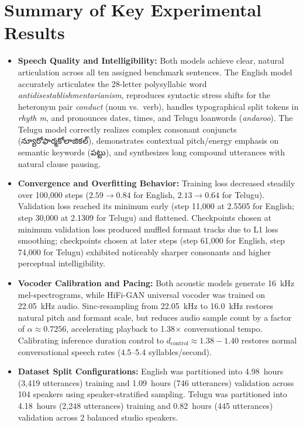 \documentclass[11pt,a4paper]{report}
\newcommand{\texttelugu}[1]{{\telugufont #1}}
\begin{document}
\section{Summary of Key Experimental Results}
\begin{itemize}
    \item \textbf{Speech Quality and Intelligibility:} Both models achieve clear, natural articulation across all ten assigned benchmark sentences. The English model accurately articulates the 28-letter polysyllabic word \textit{antidisestablishmentarianism}, reproduces syntactic stress shifts for the heteronym pair \textit{conduct} (noun vs.\ verb), handles typographical split tokens in \textit{rhyth  m}, and pronounces dates, times, and Telugu loanwords (\textit{andaroo}). The Telugu model correctly realizes complex consonant conjuncts (\texttelugu{న్యూరోఫార్మకోలాజికల్}), demonstrates contextual pitch/energy emphasis on semantic keywords (\texttelugu{పట్టు}), and synthesizes long compound utterances with natural clause pausing.
    \item \textbf{Convergence and Overfitting Behavior:} Training loss decreased steadily over 100{,}000 steps ($2.59 \to 0.84$ for English, $2.13 \to 0.64$ for Telugu). Validation loss reached its minimum early (step 11{,}000 at 2.5505 for English; step 30{,}000 at 2.1309 for Telugu) and flattened. Checkpoints chosen at minimum validation loss produced muffled formant tracks due to L1 loss smoothing; checkpoints chosen at later steps (step 61{,}000 for English, step 74{,}000 for Telugu) exhibited noticeably sharper consonants and higher perceptual intelligibility.
    \item \textbf{Vocoder Calibration and Pacing:} Both acoustic models generate 16~kHz mel-spectrograms, while HiFi-GAN universal vocoder was trained on 22.05~kHz audio. Sinc-resampling from 22.05~kHz to 16.0~kHz restores natural pitch and formant scale, but reduces audio sample count by a factor of $\alpha \approx 0.7256$, accelerating playback to 1.38$\times$ conversational tempo. Calibrating inference duration control to $d_{\text{control}} \approx 1.38 - 1.40$ restores normal conversational speech rates (4.5--5.4 syllables/second).
    \item \textbf{Dataset Split Configurations:} English was partitioned into 4.98~hours (3{,}419 utterances) training and 1.09~hours (746 utterances) validation across 104 speakers using speaker-stratified sampling. Telugu was partitioned into 4.18~hours (2{,}248 utterances) training and 0.82~hours (445 utterances) validation across 2 balanced studio speakers.
\end{itemize}
\end{document}
